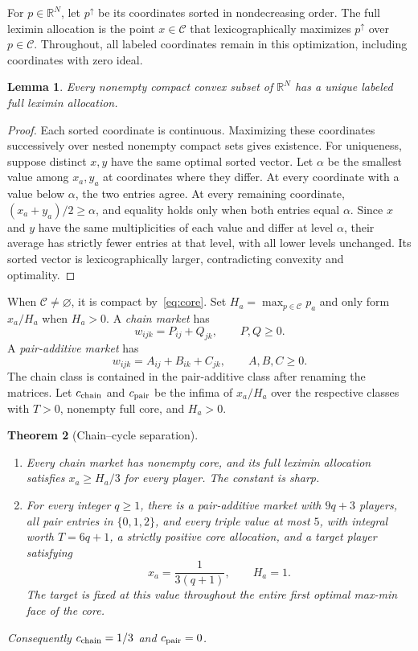 \documentclass[11pt]{article}
\newtheorem{theorem}{Theorem}[section]
\newtheorem{lemma}[theorem]{Lemma}
\theoremstyle{remark}\newtheorem{remark}[theorem]{Remark}
\newcommand{\core}{\mathcal C}
\newcommand{\R}{\mathbb R}
\begin{document}
For $p\in\R^N$, let $p^\uparrow$ be its coordinates sorted in
nondecreasing order. The full leximin allocation is the point $x\in\core$
that lexicographically maximizes $p^\uparrow$ over $p\in\core$.
Throughout, all labeled coordinates remain in this optimization, including
coordinates with zero ideal.

\begin{lemma}\label{lem:unique}
Every nonempty compact convex subset of $\R^N$ has a unique labeled full
leximin allocation.
\end{lemma}
\begin{proof}
Each sorted coordinate is continuous. Maximizing these coordinates
successively over nested nonempty compact sets gives existence.
For uniqueness, suppose distinct $x,y$ have the same optimal sorted vector.
Let $\alpha$ be the smallest value among $x_a,y_a$ at coordinates where
they differ. At every coordinate with a value below $\alpha$, the two
entries agree. At every remaining
coordinate, $(x_a+y_a)/2\geq\alpha$, and equality holds only when both
entries equal $\alpha$. Since $x$ and $y$ have the same multiplicities of
each value and differ at level $\alpha$, their average has strictly fewer
entries at that level, with all lower levels unchanged. Its sorted vector
is lexicographically larger, contradicting convexity and optimality.
\end{proof}

When $\core\ne\varnothing$, it is compact by~\eqref{eq:core}.
Set $H_a=\max_{p\in\core}p_a$ and only form $x_a/H_a$ when $H_a>0$.
A \emph{chain market} has
\begin{equation}\label{eq:chain}
 w_{ijk}=P_{ij}+Q_{jk},\qquad P,Q\geq0.
\end{equation}
A \emph{pair-additive market} has
\begin{equation}\label{eq:pair}
 w_{ijk}=A_{ij}+B_{ik}+C_{jk},\qquad A,B,C\geq0.
\end{equation}
The chain class is contained in the pair-additive class after renaming the
matrices. Let $c_{\rm chain}$ and $c_{\rm pair}$ be the infima of $x_a/H_a$
over the respective classes with $T>0$, nonempty full core, and $H_a>0$.

\begin{theorem}[Chain--cycle separation]\label{thm:main}
\hfill
\begin{enumerate}[label=(\roman*)]
\item Every chain market has nonempty core, and its full leximin allocation
      satisfies $x_a\geq H_a/3$ for every player. The constant is sharp.
\item For every integer $q\geq1$, there is a pair-additive market with
      $9q+3$ players, all pair entries in $\{0,1,2\}$, and every triple
      value at most $5$, with integral worth $T=6q+1$, a strictly positive
      core allocation, and a target player satisfying
      \[
             x_a=\frac{1}{3(q+1)},\qquad H_a=1.
      \]
      The target is fixed at this value throughout the entire first
      optimal max-min face of the core.
\end{enumerate}
Consequently $c_{\rm chain}=1/3$ and $c_{\rm pair}=0$.
\end{theorem}
\end{document}
